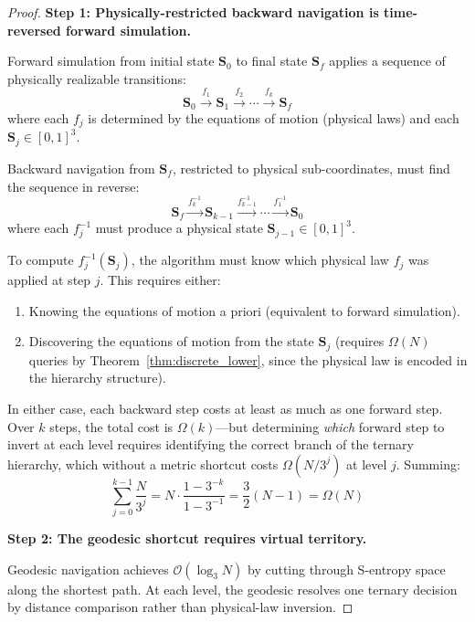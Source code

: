 \documentclass[12pt,twocolumn]{article}
\begin{document}
\begin{proof}
\textbf{Step 1: Physically-restricted backward navigation is time-reversed forward simulation.}

Forward simulation from initial state $\mathbf{S}_0$ to final state $\mathbf{S}_f$ applies a sequence of physically realizable transitions:
\begin{equation}
\mathbf{S}_0 \xrightarrow{f_1} \mathbf{S}_1 \xrightarrow{f_2} \cdots \xrightarrow{f_k} \mathbf{S}_f
\end{equation}
where each $f_j$ is determined by the equations of motion (physical laws) and each $\mathbf{S}_j \in [0,1]^3$.

Backward navigation from $\mathbf{S}_f$, restricted to physical sub-coordinates, must find the sequence in reverse:
\begin{equation}
\mathbf{S}_f \xrightarrow{f_k^{-1}} \mathbf{S}_{k-1} \xrightarrow{f_{k-1}^{-1}} \cdots \xrightarrow{f_1^{-1}} \mathbf{S}_0
\end{equation}
where each $f_j^{-1}$ must produce a physical state $\mathbf{S}_{j-1} \in [0,1]^3$.

To compute $f_j^{-1}(\mathbf{S}_j)$, the algorithm must know which physical law $f_j$ was applied at step $j$. This requires either:
\begin{enumerate}
\item[(a)] Knowing the equations of motion a priori (equivalent to forward simulation).
\item[(b)] Discovering the equations of motion from the state $\mathbf{S}_j$ (requires $\Omega(N)$ queries by Theorem~\ref{thm:discrete_lower}, since the physical law is encoded in the hierarchy structure).
\end{enumerate}

In either case, each backward step costs at least as much as one forward step. Over $k$ steps, the total cost is $\Omega(k)$---but determining \emph{which} forward step to invert at each level requires identifying the correct branch of the ternary hierarchy, which without a metric shortcut costs $\Omega(N/3^j)$ at level $j$. Summing:
\begin{equation}
\sum_{j=0}^{k-1} \frac{N}{3^j} = N \cdot \frac{1 - 3^{-k}}{1 - 3^{-1}} = \frac{3}{2}(N - 1) = \Omega(N)
\end{equation}

\textbf{Step 2: The geodesic shortcut requires virtual territory.}

Geodesic navigation achieves $\mathcal{O}(\log_3 N)$ by cutting through S-entropy space along the shortest path. At each level, the geodesic resolves one ternary decision by distance comparison rather than physical-law inversion.


\end{proof}
\end{document}
